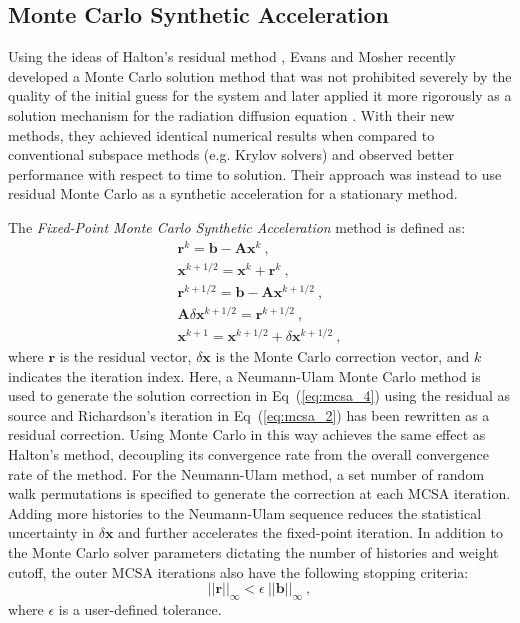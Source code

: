 \documentclass{snamc2013}
\begin{document}
\subsection{Monte Carlo Synthetic Acceleration}
Using the ideas of Halton's residual method
\cite{halton_sequential_1994}, Evans and Mosher recently developed a
Monte Carlo solution method that was not prohibited severely by the
quality of the initial guess for the system \cite{evans_monte_2009}
and later applied it more rigorously as a solution mechanism for the
radiation diffusion equation \cite{evans_monte_2012}. With their new
methods, they achieved identical numerical results when compared to
conventional subspace methods (e.g. Krylov solvers) and observed
better performance with respect to time to solution. Their approach
was instead to use residual Monte Carlo as a synthetic acceleration
for a stationary method.

The \textit{Fixed-Point Monte Carlo Synthetic Acceleration} method is
defined as:
\begin{subequations}
  \begin{gather}
    \label{eq:mcsa_1}
    \mathbf{r}^{k} = \mathbf{b} - \mathbf{A}\mathbf{x}^{k}\:,\\
    \label{eq:mcsa_2}
    \mathbf{x}^{k+1/2} = \mathbf{x}^k + \mathbf{r}^k\:,\\
    \label{eq:mcsa_3}
    \mathbf{r}^{k+1/2} = \mathbf{b} - \mathbf{A}\mathbf{x}^{k+1/2}\:,\\
    \label{eq:mcsa_4}
    \mathbf{A}\delta\mathbf{x}^{k+1/2} = \mathbf{r}^{k+1/2}\:,\\
    \label{eq:mcsa_5}
    \mathbf{x}^{k+1} = \mathbf{x}^{k+1/2} + \delta \mathbf{x}^{k+1/2}\:,
  \end{gather}
  \label{eq:mcsa}
\end{subequations}
where $\mathbf{r}$ is the residual vector, $\delta\mathbf{x}$ is the
Monte Carlo correction vector, and $k$ indicates the iteration
index. Here, a Neumann-Ulam Monte Carlo method is used to generate the
solution correction in Eq~(\ref{eq:mcsa_4}) using the residual as
source and Richardson's iteration in Eq~(\ref{eq:mcsa_2}) has been
rewritten as a residual correction. Using Monte Carlo in this way
achieves the same effect as Halton's method, decoupling its
convergence rate from the overall convergence rate of the method. For
the Neumann-Ulam method, a set number of random walk permutations is
specified to generate the correction at each MCSA iteration. Adding
more histories to the Neumann-Ulam sequence reduces the statistical
uncertainty in $\delta\mathbf{x}$ and further accelerates the
fixed-point iteration. In addition to the Monte Carlo solver
parameters dictating the number of histories and weight cutoff, the
outer MCSA iterations also have the following stopping criteria:
\begin{equation}
  ||\mathbf{r}||_\infty < \epsilon \ ||\mathbf{b}||_\infty\:,
  \label{eq:mcsa_stopping_criteria}
\end{equation}
where $\epsilon$ is a user-defined tolerance.
\end{document}
